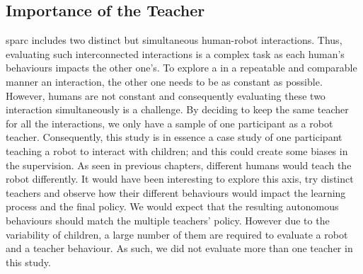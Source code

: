 \subsection{Importance of the Teacher}

\gls{sparc} includes two distinct but simultaneous human-robot interactions. Thus, evaluating such interconnected interactions is a complex task as each human's behaviours impacts the other one's. To explore a in a repeatable and comparable manner an interaction, the other one needs to be as constant as possible. However, humans are not constant and consequently evaluating these two interaction simultaneously is a challenge. By deciding to keep the same teacher for all the interactions, we only have a sample of one participant as a robot teacher. Consequently, this study is in essence a case study of one participant teaching a robot to interact with children; and this could create some biases in the supervision. As seen in previous chapters, different humans would teach the robot differently. It would have been interesting to explore this axis, try distinct teachers and observe how their different behaviours would impact the learning process and the final policy. We would expect that the resulting autonomous behaviours should match the multiple teachers' policy. However due to the variability of children, a large number of them are required to evaluate a robot and a teacher behaviour. As such, we did not evaluate more than one teacher in this study.
%


